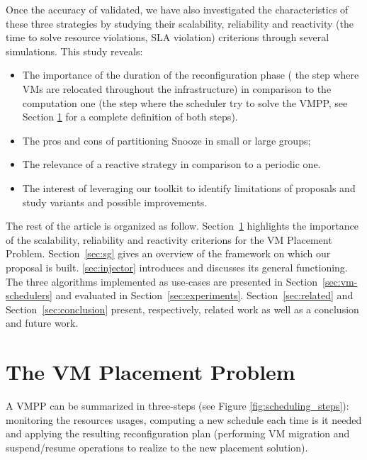 Once the accuracy of \vmps validated, we have also investigated the
characteristics of these three strategies by studying their
scalability, reliability and reactivity (\ie the time to solve
resource violations, \aka SLA violation) criterions through several
simulations. This study reveals:
\begin{itemize}
\item The importance of the duration of the reconfiguration phase (\ie
  the step where VMs are relocated throughout the infrastructure) in
  comparison to the computation one (\ie the step where the scheduler
  try to solve the VMPP, see Section \ref{sec:vmpp} for a complete
  definition of both steps).
\item The pros and cons of partitioning Snooze in small or large
  groups;
\item The relevance of a reactive strategy in comparison to a periodic
  one.
\item The interest of leveraging our toolkit to identify limitations
  of proposals and study variants and possible improvements.
\end{itemize}

The rest of the article is
organized as follow. Section~\ref{sec:vmpp} highlights the importance
of the scalability, reliability and reactivity criterions for the VM
Placement Problem.
Section~\ref{sec:sg} gives an overview of the \sg
framework on which our proposal is built. \ref{sec:injector}
introduces \vmps and discusses its general functioning. The three
algorithms implemented as use-cases are presented in
Section~\ref{sec:vm-schedulers} and evaluated in
Section~\ref{sec:experiments}. Section~\ref{sec:related} and
Section~\ref{sec:conclusion} present, respectively, related work as
well as a conclusion and future work.

\section{The VM Placement Problem}
\label{sec:vmpp}

A VMPP can be summarized in three-steps (see Figure
\ref{fig:scheduling_steps}): monitoring the resources usages,
computing a new schedule each time is it needed and applying the
resulting reconfiguration plan (\ie performing VM migration and
suspend/resume operations to realize to the new placement solution).

